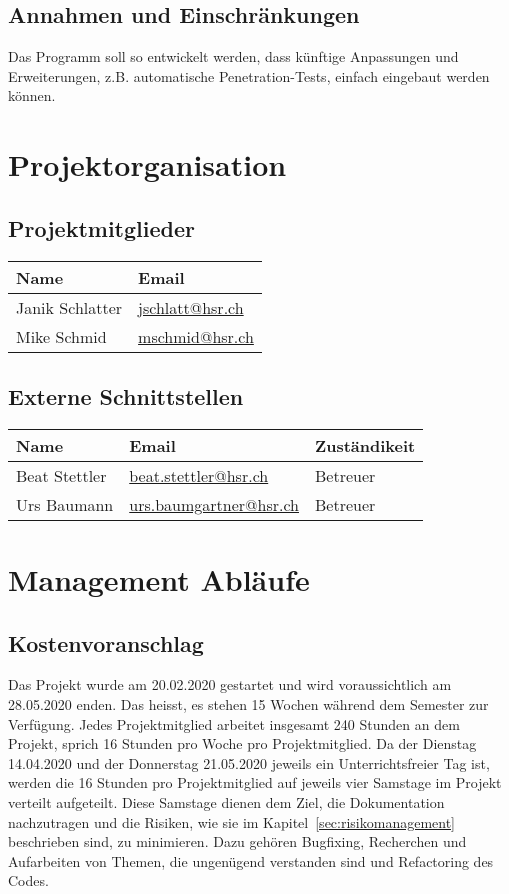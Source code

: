 \documentclass[
	ngerman,
	toc=listof, %
	toc=bibliography, %
	footnotes=multiple, %
	parskip=half, %
	numbers=noendperiod %
]{scrartcl}
\begin{document}
	\subsection{Annahmen und Einschränkungen}
		Das Programm soll so entwickelt werden, dass künftige Anpassungen und Erweiterungen, z.B. automatische Penetration-Tests, einfach eingebaut werden können.

\section{Projektorganisation}

	\subsection{Projektmitglieder}
		\begin{tabularx}{0.9\textwidth}{lX}
			\toprule
			Name & Email \\
			\midrule
			Janik Schlatter & \url{jschlatt@hsr.ch} \\
			Mike Schmid & \url{mschmid@hsr.ch} \\
			\bottomrule
		\end{tabularx}

	\subsection{Externe Schnittstellen}
		\begin{tabularx}{0.9\textwidth}{lXl}
			\toprule
			Name & Email & Zuständikeit \\
			\midrule
			Beat Stettler & \url{beat.stettler@hsr.ch} & Betreuer \\
			Urs Baumann & \url{urs.baumgartner@hsr.ch} & Betreuer \\
			\bottomrule
		\end{tabularx}

\section{Management Abläufe}

	\subsection{Kostenvoranschlag}
		Das Projekt wurde am 20.02.2020 gestartet und wird voraussichtlich am 28.05.2020 enden.
		Das heisst, es stehen 15 Wochen während dem Semester zur Verfügung. 
		Jedes Projektmitglied arbeitet insgesamt 240 Stunden an dem Projekt, sprich 16 Stunden pro Woche pro Projektmitglied.
		Da der Dienstag 14.04.2020 und der Donnerstag 21.05.2020 jeweils ein Unterrichtsfreier Tag ist, werden die 16 Stunden pro Projektmitglied auf jeweils vier Samstage im Projekt verteilt aufgeteilt.
		Diese Samstage dienen dem Ziel, die Dokumentation nachzutragen und die Risiken, wie sie im Kapitel~\ref{sec:risikomanagement} beschrieben sind, zu minimieren. 
		Dazu gehören Bugfixing, Recherchen und Aufarbeiten von Themen, die ungenügend verstanden sind und Refactoring des Codes.
\end{document}
